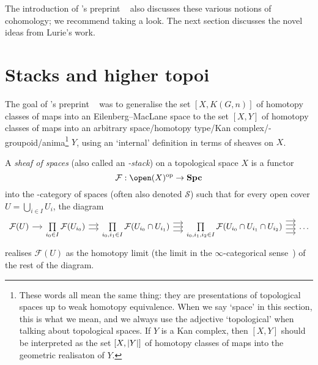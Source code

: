 The introduction of \citeauthor{lurieInfinityTopoi2003}'s preprint ~\cite{lurieInfinityTopoi2003} also discusses these various notions of cohomology; we recommend taking a look.
The next section discusses the novel ideas from Lurie's work.

\section{Stacks and higher topoi}
The goal of \citeauthor{lurieInfinityTopoi2003}'s preprint ~\cite{lurieInfinityTopoi2003} was to generalise the set \([X,K(G,n)]\) of homotopy classes of maps into an Eilenberg--MacLane space to the set \([X,Y]\) of homotopy classes of maps into an arbitrary space/homotopy type/Kan complex/\oo-groupoid/anima\footnote{These words all mean the same thing: they are presentations of topological spaces up to weak homotopy equivalence. When we say `space' in this section, this is what we mean, and we always use the adjective `topological' when talking about topological spaces. If \(Y\) is a Kan complex, then \([X,Y]\) should be interpreted as the set \([X,\lvert Y\rvert]\) of homotopy classes of maps into the geometric realisaton of \(Y\).} \(Y\), using an `internal' definition in terms of sheaves on \(X\).

\begin{defn}
A \emph{sheaf of spaces} (also called an \emph{\oo-stack}) on a topological space \(X\) is a functor
\[ \mathcal F\colon\open(X)\opp\to\catSpace \]
into the \oo-category of spaces (often also denoted \(\mathcal S\)) such that for every open cover \(U=\bigcup_{i\in I}U_i\), the diagram
\begin{equation*}
  \begin{tikzcd}[column sep=small]
    \mathcal F(U) \ar{r} & \prod\limits_{i_0\in I}\mathcal F(U_{i_0}) \ar[shift left]{r} \ar[shift right]{r} & \prod\limits_{i_0,i_1\in I}\mathcal F(U_{i_0}\cap U_{i_1}) \ar[shift left=2]{r} \ar{r} \ar[shift right=2]{r} & \prod\limits_{i_0,i_1,i_2\in I}\mathcal F(U_{i_0}\cap U_{i_1}\cap U_{i_2}) \ar[shift left=3]{r} \ar[shift left]{r} \ar[shift right]{r} \ar[shift right=3]{r} & \ldots
  \end{tikzcd}
\end{equation*}
realises \(\mathcal F(U)\) as the homotopy limit (the limit in the \(\infty\)-categorical sense~\cite[Definition 1.2.13.4]{lurieHigherToposTheory2009}) of the rest of the diagram.
\end{defn}

